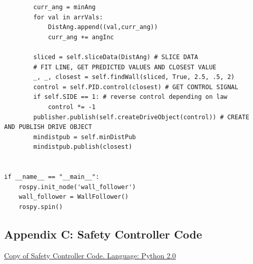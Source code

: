 \documentclass{article}
\begin{document}
{\begin{verbatim}
        curr_ang = minAng
        for val in arrVals:
            DistAng.append((val,curr_ang))
            curr_ang += angInc

        sliced = self.sliceData(DistAng) # SLICE DATA
        # FIT LINE, GET PREDICTED VALUES AND CLOSEST VALUE
        _, _, closest = self.findWall(sliced, True, 2.5, .5, 2) 
        control = self.PID.control(closest) # GET CONTROL SIGNAL
        if self.SIDE == 1: # reverse control depending on law
            control *= -1
        publisher.publish(self.createDriveObject(control)) # CREATE AND PUBLISH DRIVE OBJECT
        mindistpub = self.minDistPub
        mindistpub.publish(closest)


if __name__ == "__main__":
    rospy.init_node('wall_follower')
    wall_follower = WallFollower()
    rospy.spin()

\end{verbatim}

}

\subsection{Appendix C: Safety Controller Code}
\underline{Copy of Safety Controller Code. Language: Python 2.0}
\end{document}
